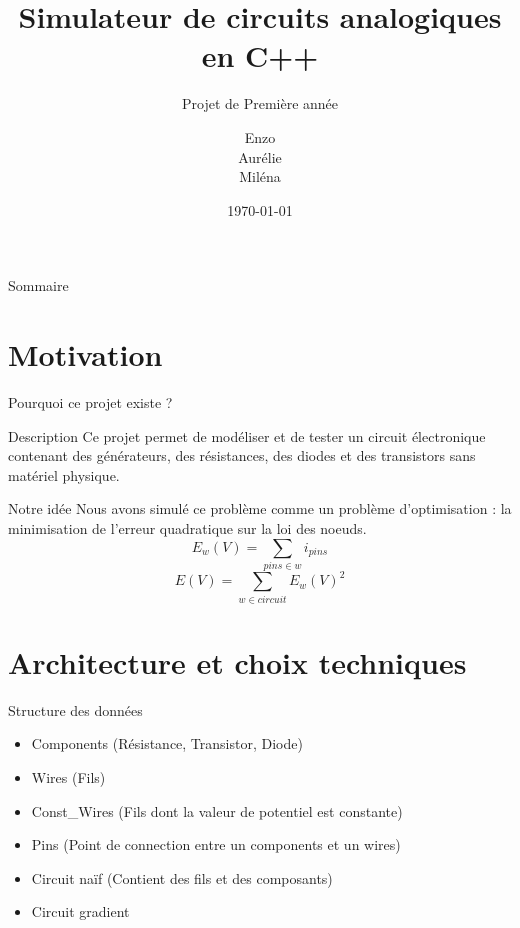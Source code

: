 \documentclass{beamer}
\title{Simulateur de circuits analogiques en C++}
\subtitle{Projet de Première année}
\author{Enzo  \\ Aurélie  \\ Miléna }
\date{\today}
\begin{document}
\begin{frame}
  \titlepage
\end{frame}

\begin{frame}{Sommaire}
  \tableofcontents
\end{frame}

\section{Motivation}

\begin{frame}{Pourquoi ce projet existe ?}
  \begin{block}{Description}
    Ce projet permet de modéliser et de tester un circuit électronique 
    contenant des générateurs, des résistances, des diodes et des transistors 
    sans matériel physique.
  \end{block}
  \begin{block}{Notre idée}
   Nous avons simulé ce problème comme un problème d'optimisation : la minimisation
   de l'erreur quadratique sur la loi des noeuds. 
   \[ E_w(V) = \sum_{pins \in w } i_{pins} \]
   \[ E(V) =  \sum_{w \in circuit} E_w(V)^{2}\]
  \end{block}
\end{frame}

\section{Architecture et choix techniques}


\begin{frame}{Structure des données}
\begin{itemize}
    \item Components (Résistance, Transistor, Diode)
    \item Wires (Fils)
    \item Const\_Wires (Fils dont la valeur de potentiel est constante)
    \item Pins (Point de connection entre un components et un wires)
    \item Circuit naïf (Contient des fils et des composants)
    \item Circuit gradient
\end{itemize}
\end{frame}
\end{document}
